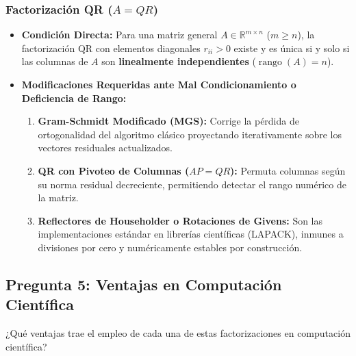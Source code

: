 \documentclass[11pt,a4paper]{article}
\theoremstyle{definition}
\theoremstyle{remark}
\begin{document}
\subsubsection{Factorización QR ($A = QR$)}
\begin{itemize}[leftmargin=*]
    \item \textbf{Condición Directa:} Para una matriz general $A \in \mathbb{R}^{m \times n}$ ($m \ge n$), la factorización QR con elementos diagonales $r_{ii} > 0$ existe y es única si y solo si las columnas de $A$ son \textbf{linealmente independientes} ($\operatorname{rango}(A) = n$).
    \item \textbf{Modificaciones Requeridas ante Mal Condicionamiento o Deficiencia de Rango:}
    \begin{enumerate}
        \item \textbf{Gram-Schmidt Modificado (MGS):} Corrige la pérdida de ortogonalidad del algoritmo clásico proyectando iterativamente sobre los vectores residuales actualizados.
        \item \textbf{QR con Pivoteo de Columnas ($AP = QR$):} Permuta columnas según su norma residual decreciente, permitiendo detectar el rango numérico de la matriz.
        \item \textbf{Reflectores de Householder o Rotaciones de Givens:} Son las implementaciones estándar en librerías científicas (LAPACK), inmunes a divisiones por cero y numéricamente estables por construcción.
    \end{enumerate}
\end{itemize}

\subsection{Pregunta 5: Ventajas en Computación Científica}

\begin{solbox}[Pregunta 5]
¿Qué ventajas trae el empleo de cada una de estas factorizaciones en computación científica?
\end{solbox}
\end{document}
